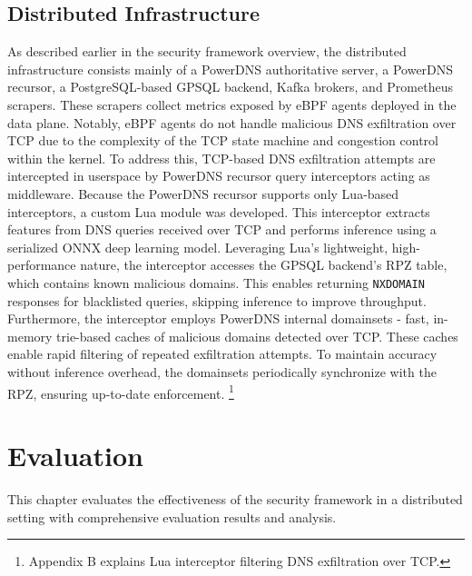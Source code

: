 \documentclass [11pt, proquest] {uwthesis}[2020/02/24]
\begin{document}
\section{Distributed Infrastructure }
As described earlier in the security framework overview, the distributed infrastructure consists mainly of a PowerDNS authoritative server, a PowerDNS recursor, a PostgreSQL-based GPSQL backend, Kafka brokers, and Prometheus scrapers. These scrapers collect metrics exposed by eBPF agents deployed in the data plane. Notably, eBPF agents do not handle malicious DNS exfiltration over TCP due to the complexity of the TCP state machine and congestion control within the kernel. To address this, TCP-based DNS exfiltration attempts are intercepted in userspace by PowerDNS recursor query interceptors acting as middleware. Because the PowerDNS recursor supports only Lua-based interceptors, a custom Lua module was developed. This interceptor extracts features from DNS queries received over TCP and performs inference using a serialized ONNX deep learning model. Leveraging Lua’s lightweight, high-performance nature, the interceptor accesses the GPSQL backend’s RPZ table, which contains known malicious domains. This enables returning \texttt{NXDOMAIN} responses for blacklisted queries, skipping inference to improve throughput.
Furthermore, the interceptor employs PowerDNS internal domainsets - fast, in-memory trie-based caches of malicious domains detected over TCP. These caches enable rapid filtering of repeated exfiltration attempts. To maintain accuracy without inference overhead, the domainsets periodically synchronize with the RPZ, ensuring up-to-date enforcement. \footnote{Appendix B explains Lua interceptor filtering DNS exfiltration over TCP.}








\chapter{Evaluation}
This chapter evaluates the effectiveness of the security framework in a distributed setting with comprehensive evaluation results and analysis.
\end{document}
